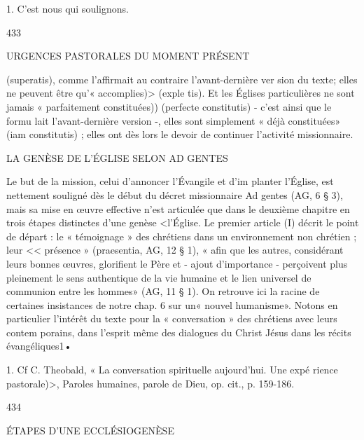 1.	C'est nous qui soulignons.


433
 
URGENCES PASTORALES DU MOMENT PRÉSENT

(superatis), comme l'affirmait au contraire l'avant-dernière ver­ sion du texte; elles ne peuvent être qu'« accomplies)> (exple­ tis). Et les Églises particulières ne sont jamais « parfaitement constituées)) (perfecte constitutis) - c'est ainsi que le formu­ lait l'avant-dernière version -, elles sont simplement « déjà constituées» (iam constitutis) ; elles ont dès lors le devoir de continuer l'activité missionnaire.

LA GENÈSE DE L'ÉGLISE SELON AD GENTES

Le but de la mission, celui d'annoncer l'Évangile et d'im­ planter l'Église, est nettement souligné dès le début du décret missionnaire Ad gentes (AG, 6 § 3), mais sa mise en œuvre effective n'est articulée que dans le deuxième chapitre en trois étapes distinctes d'une genèse <l'Église. Le premier article (I) décrit le point de départ : le « témoignage » des chrétiens dans un environnement non chrétien ; leur << présence » (praesentia, AG, 12 § 1), « afin que les autres, considérant leurs bonnes œuvres, glorifient le Père et - ajout d'importance - perçoivent plus pleinement le sens authentique de la vie humaine et le lien universel de communion entre les hommes» (AG, 11 § 1). On retrouve ici la racine de certaines insistances de notre chap. 6 sur un« nouvel humanisme». Notons en particulier l'intérêt du texte pour la « conversation » des chrétiens avec leurs contem­ porains, dans l'esprit même des dialogues du Christ Jésus dans les récits évangéliques1•

1.	Cf C. Theobald, « La conversation spirituelle aujourd'hui. Une expé­ rience pastorale)>, Paroles humaines, parole de Dieu, op. cit., p. 159-186.

434
 
ÉTAPES D'UNE ECCLÉSIOGENÈSE

